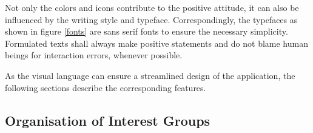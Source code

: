 \documentclass[12pt,numbers=noenddot,parskip,bibliography=totocnumbered,listof=totocnumbered,draft=true]{scrreprt}
\begin{document}
Not only the colors and icons contribute to the positive attitude, it can also be influenced by the writing style and typeface. Correspondingly, the typefaces as shown in figure \ref{fonts} are sans serif fonts to ensure the necessary simplicity. Formulated texts shall always make positive statements and do not blame human beings for interaction errors, whenever possible.

As the visual language can ensure a streamlined design of the application, the following sections describe the corresponding features.


\subsection{Organisation of Interest Groups}

\begin{figure}
\centering
{}
\qquad

\end{figure}
\end{document}
